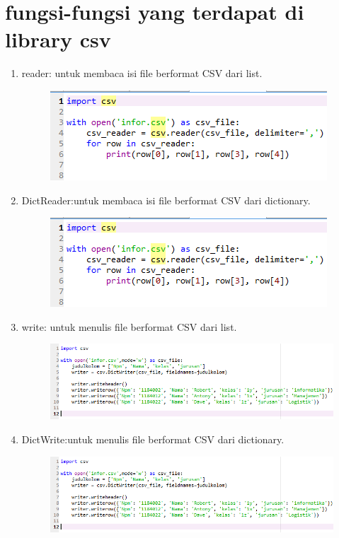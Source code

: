 \documentclass[a4paper,12pt]{report}
\begin{document}
\section*{fungsi-fungsi yang terdapat di library csv}
\begin{enumerate}

\item reader: untuk membaca isi file berformat CSV dari list.
\begin{figure}[h]
\includegraphics[scale=0.5]{gambar/7.png}
\end{figure}

\item DictReader:untuk membaca isi file berformat CSV dari dictionary.
\begin{figure}[h]
\includegraphics[scale=0.5]{gambar/7.png}
\end{figure}

\item write: untuk menulis file berformat CSV dari list.
\begin{figure}[h]
\includegraphics[scale=0.5]{gambar/8.png}
\end{figure}
\newpage
\item DictWrite:untuk menulis file berformat CSV dari dictionary.
\begin{figure}[h]
\includegraphics[scale=0.5]{gambar/8.png}
\end{figure}
\end{enumerate}
\end{document}
